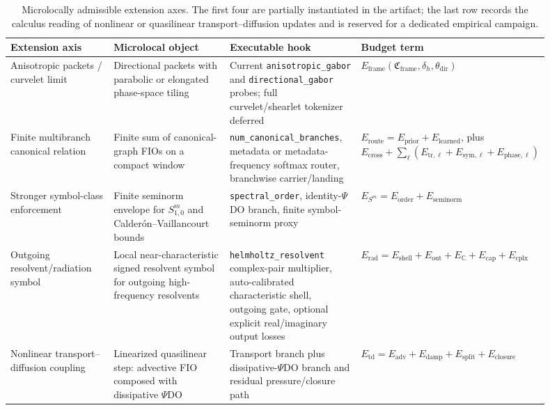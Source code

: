 \begin{table}[t]
\centering
\scriptsize
\setlength{\tabcolsep}{3pt}
\begin{tabular}{p{0.20\linewidth}p{0.25\linewidth}p{0.25\linewidth}p{0.20\linewidth}}
\toprule
Extension axis & Microlocal object & Executable hook & Budget term \\
\midrule
Anisotropic packets / curvelet limit
& Directional packets with parabolic or elongated phase-space tiling
& Current \texttt{anisotropic\_gabor} and \texttt{directional\_gabor} probes; full curvelet/shearlet tokenizer deferred
& $E_{\mathrm{frame}}(\mathfrak C_{\mathrm{frame}},\delta_h,\theta_{\mathrm{dir}})$ \\
Finite multibranch canonical relation
& Finite sum of canonical-graph FIOs on a compact window
& \texttt{num\_canonical\_branches}, metadata or metadata-frequency softmax router, branchwise carrier/landing
& $E_{\mathrm{route}}=E_{\mathrm{prior}}+E_{\mathrm{learned}}$, plus $E_{\mathrm{cross}}+\sum_\ell(E_{\mathrm{tr},\ell}+E_{\mathrm{sym},\ell}+E_{\mathrm{phase},\ell})$ \\
Stronger symbol-class enforcement
& Finite seminorm envelope for $S^m_{1,0}$ and Calder\'on--Vaillancourt bounds
& \texttt{spectral\_order}, identity-$\Psi$DO branch, finite symbol-seminorm proxy
& $E_{S^m}=E_{\mathrm{order}}+E_{\mathrm{seminorm}}$ \\
Outgoing resolvent/radiation symbol
& Local near-characteristic signed resolvent symbol for outgoing high-frequency resolvents
& \texttt{helmholtz\_resolvent} complex-pair multiplier, auto-calibrated characteristic shell, outgoing gate, optional explicit real/imaginary output losses
& $E_{\mathrm{rad}}=E_{\mathrm{shell}}+E_{\mathrm{out}}+E_{\mathbb C}+E_{\mathrm{cap}}+E_{\mathrm{cplx}}$ \\
Nonlinear transport--diffusion coupling
& Linearized quasilinear step: advective FIO composed with dissipative $\Psi$DO
& Transport branch plus dissipative-$\Psi$DO branch and residual pressure/closure path
& $E_{\mathrm{td}}=E_{\mathrm{adv}}+E_{\mathrm{damp}}+E_{\mathrm{split}}+E_{\mathrm{closure}}$ \\
\bottomrule
\end{tabular}
\caption{Microlocally admissible extension axes.  The first four are partially instantiated in the artifact; the last row records the calculus reading of nonlinear or quasilinear transport--diffusion updates and is reserved for a dedicated empirical campaign.}
\label{tab:admissible-extension-axes}
\end{table}

